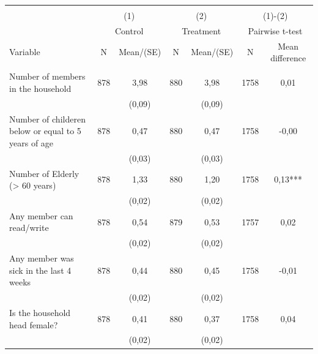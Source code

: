 
\begin{tabular}{@{\extracolsep{5pt}}lcccccc}
\\[-1.8ex]\hline \hline \\[-1.8ex]
 & \multicolumn{2}{c}{(1)}  & \multicolumn{2}{c}{(2)}  & \multicolumn{2}{c}{(1)-(2)} \\
 & \multicolumn{2}{c}{Control}  & \multicolumn{2}{c}{Treatment}  & \multicolumn{2}{c}{Pairwise t-test}  \\
Variable & N & Mean/(SE) & N & Mean/(SE) & N & Mean difference \\ \hline \\[-1.8ex] 
Number of members in the household   & 878    & 3,98    & 880    & 3,98    & 1758    & 0,01   \\
 &   & (0,09)  &   & (0,09)  &   &  \\ [1ex]
Number of childeren below or equal to 5 years of age   & 878    & 0,47    & 880    & 0,47    & 1758    & -0,00   \\
 &   & (0,03)  &   & (0,03)  &   &  \\ [1ex]
Number of Elderly (> 60 years)   & 878    & 1,33    & 880    & 1,20    & 1758    & 0,13***   \\
 &   & (0,02)  &   & (0,02)  &   &  \\ [1ex]
Any member can read/write   & 878    & 0,54    & 879    & 0,53    & 1757    & 0,02   \\
 &   & (0,02)  &   & (0,02)  &   &  \\ [1ex]
Any member was sick in the last 4 weeks   & 878    & 0,44    & 880    & 0,45    & 1758    & -0,01   \\
 &   & (0,02)  &   & (0,02)  &   &  \\ [1ex]
Is the household head female?   & 878    & 0,41    & 880    & 0,37    & 1758    & 0,04   \\
 &   & (0,02)  &   & (0,02)  &   &  \\ [1ex]

\end{tabular}
